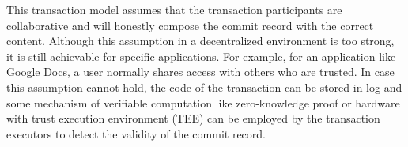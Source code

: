 This transaction model assumes that the transaction participants are collaborative and will honestly compose the commit record with the correct content.
Although this assumption in a decentralized environment is too strong, it is still achievable for specific applications. 
For example, for an application like Google Docs, a user normally shares access with others who are trusted. 
In case this assumption cannot hold, the code of the transaction can be stored in \project log and some mechanism of verifiable computation like zero-knowledge proof or hardware with trust execution environment (TEE) can be employed by the transaction executors to detect the validity of the commit record.

